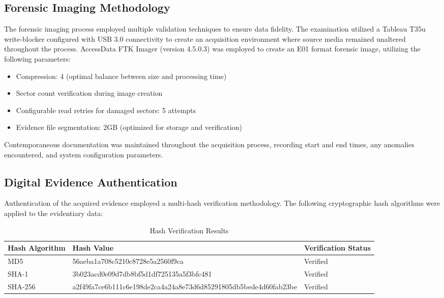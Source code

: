 \subsection{Forensic Imaging Methodology}
The forensic imaging process employed multiple validation techniques to ensure data fidelity. The examination utilized a Tableau T35u write-blocker configured with USB 3.0 connectivity to create an acquisition environment where source media remained unaltered throughout the process. AccessData FTK Imager (version 4.5.0.3) was employed to create an E01 format forensic image, utilizing the following parameters:
\begin{itemize}
    \item Compression: 4 (optimal balance between size and processing time)
    \item Sector count verification during image creation
    \item Configurable read retries for damaged sectors: 5 attempts
    \item Evidence file segmentation: 2GB (optimized for storage and verification)
\end{itemize}

Contemporaneous documentation was maintained throughout the acquisition process, recording start and end times, any anomalies encountered, and system configuration parameters.

\subsection{Digital Evidence Authentication}
Authentication of the acquired evidence employed a multi-hash verification methodology. The following cryptographic hash algorithms were applied to the evidentiary data:

\begin{table}[h]
\centering
\begin{tabular}{|p{3cm}|p{8cm}|p{4cm}|}
\hline
\textbf{Hash Algorithm} & \textbf{Hash Value} & \textbf{Verification Status} \\
\hline
MD5 & 56aeba1a708c5210c8728e5a2560f9ca  & Verified \\
\hline
SHA-1 & 3b023acd0e09d7db8bf5d1df725135a5f3bfc481 & Verified \\
\hline
SHA-256 & a2f49fa7ce6b111c6e198de2ca4a24a8e73d6d85291805db5bede4d60fab23be  & Verified \\
\hline
\end{tabular}
\caption{Hash Verification Results}
\label{tab:hash_verification}
\end{table}


